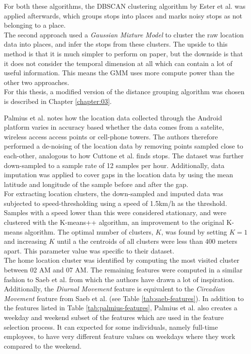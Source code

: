 For both these algorithms, the DBSCAN clustering algorithm by Ester et al. \cite{density-based-1996} was applied afterwards, which groups stops into places and marks noisy stops as not belonging to a place.\\

The second approach used a \textit{Gaussian Mixture Model} to cluster the raw location data into places, and infer the stops from these clusters. The upside to this method is that it is much simpler to perform on paper, but the downside is that it does not consider the temporal dimension at all which can contain a lot of useful information. This means the GMM uses more compute power than the other two approaches. \\

For this thesis, a modified version of the distance grouping algorithm was chosen is described in Chapter \ref{chapter:03}.

Palmius et al. notes how the location data collected through the Android platform varies in accuracy based whether the data comes from a satelite, wireless access access points or cell-phone towers. The authors therefore performed a de-noising of the location data by removing points sampled close to each-other, analogous to how Cuttone et al. finds stops. The dataset was further down-sampled to a sample rate of 12 samples per hour. Additionally, data imputation was applied to cover gaps in the location data by using the mean latitude and longitude of the sample before and after the gap. \\

For extracting location clusters, the down-sampled and imputed data was subjected to speed-thresholding using a speed of 1.5km/h as the threshold. Samples with a speed lower than this were considered stationary, and were clustered with the K-means++ algorithm, an improvement to the original K-means algorithm. The optimal number of clusters, $K$, was found by setting $K=1$ and increasing $K$ until a the centroids of all clusters were less than 400 meters apart. This parameter value was specific to their dataset.\\

The home location cluster was identified by computing the most visited cluster between 02 AM and 07 AM. The remaining features were computed in a similar fashion to Saeb et al. from which the authors have drawn a lot of inspiration. Additionally, the \textit{Diurnal Movement} feature is equivalent to the \textit{Circadian Movement }feature from Saeb et al. (see Table \ref{tab:saeb-features}). In addition to the features listed in Table \ref{tab:palmius-features}, Palmius et al. also creates a weekday and weekend subset of the features which are used in the feature selection process. It can expected for some individuals, namely full-time employees, to have very different feature values on weekdays where they work compared to the weekend.\\

